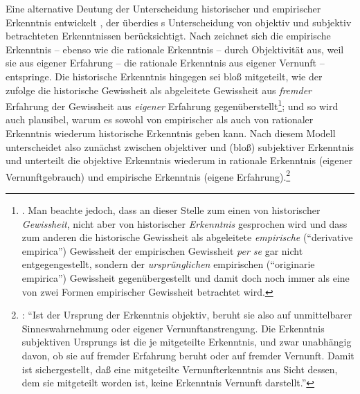 Eine alternative Deutung der Unterscheidung historischer und empirischer
Erkenntnis entwickelt , der überdies
s Unterscheidung von objektiv und subjektiv betrachteten
Erkenntnissen berücksichtigt. Nach 
zeichnet sich die empirische Erkenntnis -- ebenso wie die rationale Erkenntnis
-- durch Objektivität aus, weil sie aus eigener Erfahrung -- die
rationale Erkenntnis aus eigener Vernunft -- entspringe. Die historische
Erkenntnis hingegen sei bloß mitgeteilt, wie  der
 zufolge die historische Gewissheit als abgeleitete
Gewissheit aus \emph{fremder} Erfahrung der Gewissheit aus \emph{eigener}
Erfahrung gegenüberstellt\footnote{\cite[Vgl.][A
107\,f.,]{Kant:ImmanuelKantsLogik1977}
\cite[][IX: 71.3--7]{Kant:GesammelteWerke1900ff.}. Man beachte jedoch, dass an
dieser Stelle zum einen von historischer \emph{Gewissheit}, nicht aber von
historischer \emph{Erkenntnis} gesprochen wird und dass zum anderen die
historische Gewissheit als abgeleitete \emph{empirische} (\enquote{derivative
empirica}) Gewissheit der empirischen Gewissheit \emph{per se} gar nicht
entgegengestellt, sondern der \emph{ursprünglichen} empirischen
(\enquote{originarie empirica}) Gewissheit gegenübergestellt und damit doch noch
immer als eine von zwei Formen empirischer Gewissheit betrachtet wird.}; und so
wird auch plausibel, warum es sowohl von empirischer als auch von rationaler
Erkenntnis wiederum historische Erkenntnis geben kann. Nach diesem Modell
unterscheidet  also zunächst zwischen objektiver und (bloß)
subjektiver Erkenntnis und unterteilt die objektive Erkenntnis wiederum in
rationale Erkenntnis (eigener Vernunftgebrauch) und empirische Erkenntnis
(eigene Erfahrung).\footnote{\cite[Vgl.][141]{Kater:PolitikRechtGeschichte1999}:
\enquote{Ist der Ursprung der Erkenntnis objektiv, beruht sie also auf
unmittelbarer Sinneswahrnehmung oder eigener Vernunftanstrengung. Die Erkenntnis
subjektiven Ursprungs ist die je mitgeteilte Erkenntnis, und zwar unabhängig
davon, ob sie auf fremder Erfahrung beruht oder auf fremder Vernunft. Damit ist
sichergestellt, daß eine mitgeteilte Vernunfterkenntnis aus Sicht dessen, dem
sie mitgeteilt worden ist, keine Erkenntnis  Vernunft darstellt.}}


